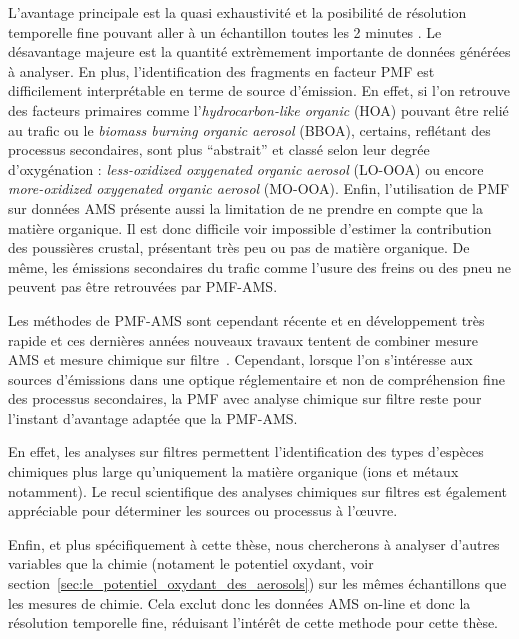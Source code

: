 L'avantage principale est la quasi exhaustivité et la posibilité de
résolution temporelle fine pouvant aller à un échantillon toutes les 2 minutes
\autocite{marmureanuOnline2020}.  Le désavantage majeure est la quantité extrèmement
importante de données générées à analyser. En plus, l'identification des fragments en
facteur PMF est difficilement interprétable en terme de source d'émission. En effet, si
l'on retrouve des facteurs primaires comme l'\textit{hydrocarbon-like organic} (HOA)
pouvant être relié au trafic ou le \textit{biomass burning organic aerosol} (BBOA),
certains, reflétant des processus secondaires, sont plus ``abstrait'' et classé selon leur
degrée d'oxygénation : \textit{less-oxidized oxygenated organic aerosol} (LO-OOA) ou
encore \textit{more-oxidized oxygenated organic aerosol} (MO-OOA).
Enfin, l'utilisation de PMF sur données AMS présente aussi la limitation de ne prendre en
compte que la matière organique. Il est donc difficile voir impossible d'estimer la
contribution des poussières crustal, présentant très peu ou pas de matière organique. De
même, les émissions secondaires du trafic comme l'usure des freins ou des pneu ne peuvent
pas être retrouvées par PMF-AMS.

Les méthodes de PMF-AMS sont cependant récente et en développement très rapide et ces
dernières années nouveaux travaux tentent de combiner mesure AMS et mesure chimique sur
filtre~\autocite{vlachouAdvanced2018,vlachouDevelopment2019}.  Cependant, lorsque l'on
s'intéresse aux sources d'émissions dans une optique réglementaire et non de compréhension
fine des processus secondaires, la PMF avec analyse chimique sur filtre reste pour
l'instant d'avantage adaptée que la PMF-AMS.

En effet, les analyses sur filtres permettent l'identification des types d'espèces
chimiques plus large qu'uniquement la matière organique (ions et métaux notamment).  Le
recul scientifique des analyses chimiques sur filtres est également appréciable pour
déterminer les sources ou processus à l'œuvre.

Enfin, et plus spécifiquement à cette thèse, nous chercherons à analyser d'autres
variables que la chimie (notament le potentiel oxydant, voir
section~\ref{sec:le_potentiel_oxydant_des_aerosols}) sur les mêmes échantillons que les
mesures de chimie. Cela exclut donc les données AMS on-line et donc la résolution
temporelle fine, réduisant l'intérêt de cette methode pour cette thèse.

